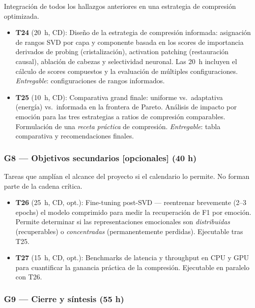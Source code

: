 \documentclass[11pt, a4paper]{article}
\begin{document}
Integración de todos los hallazgos anteriores en una estrategia de compresión optimizada.

\begin{itemize}[nosep, leftmargin=1.2em, itemsep=2pt]
    \item \textbf{T24} (20~h, CD): Diseño de la estrategia de compresión informada: asignación de rangos SVD por capa y componente basada en los scores de importancia derivados de probing (cristalización), activation patching (restauración causal), ablación de cabezas y selectividad neuronal. Las 20~h incluyen el cálculo de scores compuestos y la evaluación de múltiples configuraciones. \textit{Entregable}: configuraciones de rangos informados.
    \item \textbf{T25} (10~h, CD): Comparativa grand finale: uniforme vs.\ adaptativa (energía) vs.\ informada en la frontera de Pareto. Análisis de impacto por emoción para las tres estrategias a ratios de compresión comparables. Formulación de una \textit{receta práctica} de compresión. \textit{Entregable}: tabla comparativa y recomendaciones finales.
\end{itemize}

\subsubsection{G8 --- Objetivos secundarios [opcionales] (40 h)}

Tareas que amplían el alcance del proyecto si el calendario lo permite. No forman parte de la cadena crítica.

\begin{itemize}[nosep, leftmargin=1.2em, itemsep=2pt]
    \item \textbf{T26} (25~h, CD, opt.): Fine-tuning post-SVD --- reentrenar brevemente (2--3 epochs) el modelo comprimido para medir la recuperación de F1 por emoción. Permite determinar si las representaciones emocionales son \textit{distribuidas} (recuperables) o \textit{concentradas} (permanentemente perdidas). Ejecutable tras T25.
    \item \textbf{T27} (15~h, CD, opt.): Benchmarks de latencia y throughput en CPU y GPU para cuantificar la ganancia práctica de la compresión. Ejecutable en paralelo con T26.
\end{itemize}

\subsubsection{G9 --- Cierre y síntesis (55 h)}
\end{document}
